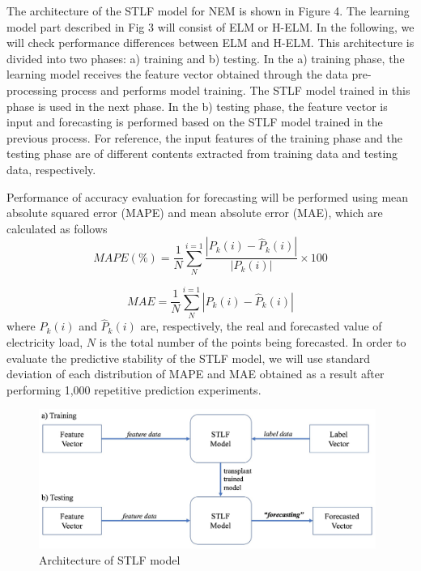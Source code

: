 \documentclass[runningheads,a4paper]{llncs}
\begin{document}
The architecture of the STLF model for NEM is shown in Figure 4. The learning model part described in Fig 3 will consist of ELM or H-ELM. In the following, we will check performance differences between ELM and H-ELM. This architecture is divided into two phases: a) training and b) testing. In the a) training phase, the learning model receives the feature vector obtained through the data pre-processing process and performs model training. The STLF model trained in this phase is used in the next phase. In the b) testing phase, the feature vector is input and forecasting is performed based on the STLF model trained in the previous process. For reference, the input features of the training phase and the testing phase are of different contents extracted from training data and testing data, respectively. 

Performance of accuracy evaluation for forecasting will be performed using mean absolute squared error (MAPE) and mean absolute error (MAE), which are calculated as follows
\begin{equation}
MAPE(\%)=\frac{1}{N} \sum_{N}^{i=1} \frac{\left | P_{k}(i)-\hat{P}_{k}(i) \right |}{\left | P_{k}(i) \right |}\times 100
\end{equation}

\begin{equation}
MAE=\frac{1}{N} \sum_{N}^{i=1} \left | P_{k}(i)-\hat{P}_{k}(i) \right |
\end{equation}
where $P_{k}(i)$ and $\hat{P}_{k}(i)$ are, respectively, the real and forecasted value of electricity load, $N$ is the total number of the points being forecasted. In order to evaluate the predictive stability of the STLF model, we will use standard deviation of each distribution of MAPE and MAE obtained as a result after performing 1,000 repetitive prediction experiments. 

\begin{figure}
\centering
\includegraphics[width=11cm]{structure_figure}
\caption{Architecture of STLF model}
\label{fig:helm_figure}
\end{figure}
\end{document}
